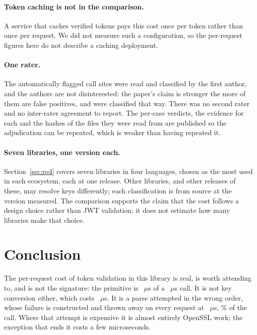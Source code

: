 \documentclass[pdflatex,sn-basic,twocolumn]{sn-jnl}%
\begin{document}
\paragraph{Token caching is not in the comparison.} A service that caches
verified tokens pays this cost once per token rather than once per request. We
did not measure such a configuration, so the per-request figures here do not
describe a caching deployment.

\paragraph{One rater.} The \AdjudicatedTotal{} automatically flagged call sites
were read and classified by the first author, and the authors are not
disinterested: the paper's claim is stronger the more of them are false
positives, and \AdjudicatedFalsePositive{} were classified that way. There was no
second rater and no inter-rater agreement to report. The per-case verdicts, the
evidence for each and the hashes of the files they were read from are published
so the adjudication can be repeated, which is weaker than having repeated it.

\paragraph{Seven libraries, one version each.} Section~\ref{sec:rq4} covers
seven libraries in four languages, chosen as the most used in each ecosystem,
each at one release. Other libraries, and other releases of these, may resolve
keys differently; each classification is from source at the version measured.
The comparison supports the claim that the cost follows a design choice rather
than JWT validation; it does not estimate how many libraries make that
choice.

\section{Conclusion}\label{sec:conclusion}

The per-request cost of token validation in this library is real, is worth
attending to, and is not the signature: the primitive is \HostHmacString~$\mu$s
of a \HostJwtString~$\mu$s call. It is not key conversion either, which costs
\HostCreateSecretKey~$\mu$s. It is a parse attempted in the wrong order, whose
failure is constructed and thrown away on every request at
\HostProbeThrows~$\mu$s, \HostProbeShareOfCall\% of the call. Where that attempt is expensive it is
almost entirely OpenSSL work; the exception that ends it costs a few
microseconds.
\end{document}
